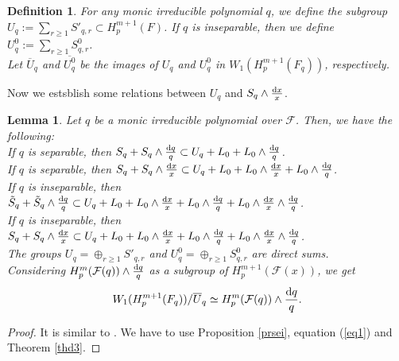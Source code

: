 \documentclass[times,10pt]{amsart}
\newcommand{\dd}{{\rm d}}
\newcommand{\F}{\ensuremath{\mathcal{F}}}
\renewcommand{\cong}{\simeq}
\newtheorem{defn}[thm]{Definition}%
\newtheorem{lemma}[thm]{Lemma}%
\begin{document}
 \begin{defn}\label{du}
 For any monic irreducible polynomial  $q$, we define  the subgroup $U_q:= \sum_{r\geq 1} S'_{q,r}\subset H_p^{m+1}(F)$. If $q$ is inseparable, then we define $ U^0_q:= \sum_{r\geq 1} S^0_{q,r}$.\\
 
  Let $ \overline{U}_q$ and $\overline{U^0_q}$ be the images of $ U_q$ {and $U^0_q$}  in $W_1(H_p^{m+1}(F_q))$, respectively.
\end{defn}
Now we estsblish some relations  between $ U_q$ and $ S_q\wedge \frac{\dd x}{x}$.
 \begin{lemma}\label{lp} Let $q$ be a monic irreducible polynomial over $\F$. Then, we have the following:\\
             
  If $q$ is separable, then $ S_q+ S_q\wedge \frac{\dd q}{q}\subset U_q+L_0+ L_0\wedge \frac{\dd q}{q}$.\\

 If $q$ is separable, then  $ S_q+ S_q\wedge \frac{\dd x}{x}\subset U_q+L_0+ L_0\wedge \frac{\dd x}{x}+L_0\wedge \frac{\dd q}{q}$.\\

  If $q$ is inseparable, then $ \tilde{S}_q+ \tilde{S}_q\wedge \frac{\dd q}{q}\subset U_q+L_0+ L_0\wedge \frac{\dd x}{x}+ L_0\wedge \frac{\dd q}{q}+ L_0\wedge \frac{\dd x}{x}\wedge \frac{\dd q}{q}$.\\

 If $q$ is inseparable, then  $  S_q+ S_q\wedge \frac{\dd x}{x}\subset  U_q+ L_0+L_0\wedge \frac{\dd x}{x}+L_0\wedge \frac{\dd q}{q}+ L_0\wedge \frac{\dd x}{x}\wedge \frac{\dd q}{q}$.\\

 The groups  $U_q= \oplus_{r\geq 1} S'_{q,r}$ and $ U_q^0= \oplus_{r\geq 1} S^0_{q,r}$ are direct sums.\\

  Considering $H_p^m(\F(q))\wedge \frac{\dd q}{q}$ as a subgroup of $H_p^{m+1}(\F(x))$, we get $$  W_1(H_p^{m+1}(F_q))/ \overline{U}_q\cong H_p^m(\F(q))\wedge \frac{\dd q}{q}.$$ 
\end{lemma}

 \begin{proof}
It is similar to \cite[Lemma 3.4]{Laghribi-Maiti}. We have to use Proposition \ref{prsei},  equation (\ref{eq1}) and Theorem \ref{thd3}. \end{proof}
\end{document}
